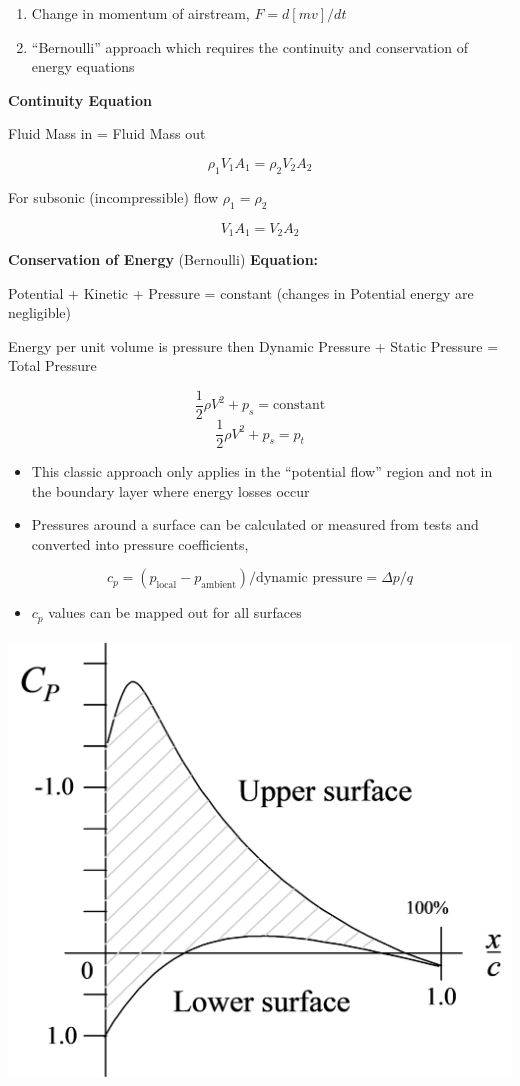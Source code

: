 \documentclass[
]{book}
\providecommand{\tightlist}{%
  \setlength{\itemsep}{0pt}\setlength{\parskip}{0pt}}
\begin{document}
\begin{enumerate}
\def\labelenumi{\arabic{enumi}.}
\tightlist
\item
  Change in momentum of airstream, \(F=d[mv]/dt\)
\item
  ``Bernoulli'' approach which requires the continuity and conservation of energy equations
\end{enumerate}

\textbf{Continuity Equation}

Fluid Mass in = Fluid Mass out

\[\rho_1 V_1 A_1 = \rho_2 V_2 A_2\]

For subsonic (incompressible) flow \(\rho_1 = \rho_2\)

\[V_1 A_1 = V_2 A_2\]

\textbf{Conservation of Energy} (Bernoulli) \textbf{Equation:}

Potential + Kinetic + Pressure = constant (changes in Potential energy are negligible)

Energy per unit volume is pressure then Dynamic Pressure + Static Pressure = Total Pressure

\[\frac{1}{2}\rho V^2 + p_s = \text{constant} \]
\[\frac{1}{2}\rho V^2 + p_s = p_t \]

\begin{itemize}
\tightlist
\item
  This classic approach only applies in the ``potential flow'' region and not in the boundary layer where energy losses occur
\item
  Pressures around a surface can be calculated or measured from tests and converted into pressure coefficients,
\end{itemize}

\[c_p = \left( p_{\mathrm{local}} - p_{\mathrm{ambient}} \right) / \text{dynamic pressure} = \Delta p/q \]

\begin{itemize}
\tightlist
\item
  \(c_p\) values can be mapped out for all surfaces
\end{itemize}

\includegraphics[width=5.333in,height=4.625in]{media/05/image11.svg}
\end{document}
